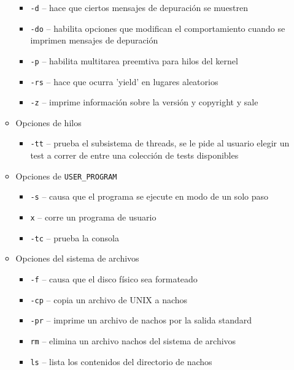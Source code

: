 \documentclass[11pt]{article}
\begin{document}
\begin{enumerate}
\begin{itemize}
                \begin{itemize}
                    \item \texttt{-d} -- hace que ciertos mensajes de depuración se muestren
                    \item \texttt{-do} -- habilita opciones que modifican el comportamiento cuando se imprimen mensajes de depuración
                    \item \texttt{-p} -- habilita multitarea preemtiva para hilos del kernel
                    \item \texttt{-rs} -- hace que ocurra 'yield' en lugares aleatorios
                    \item \texttt{-z} -- imprime información sobre la versión y copyright y sale
                \end{itemize}
            \item Opciones de hilos
                \begin{itemize}
                    \item \texttt{-tt} -- prueba el subsistema de threads, se le pide al usuario 
                          elegir un test a correr de entre una colección de tests disponibles
                \end{itemize}
            \item Opciones de \texttt{USER\_PROGRAM}
                \begin{itemize}
                    \item \texttt{-s} -- causa que el programa se ejecute en modo de un solo paso
                    \item \texttt{x} -- corre un programa de usuario
                    \item \texttt{-tc} -- prueba la consola
                \end{itemize}
            \item Opciones del sistema de archivos
                \begin{itemize}
                    \item \texttt{-f} -- causa que el disco físico sea formateado
                    \item \texttt{-cp} -- copia un archivo de UNIX a nachos
                    \item \texttt{-pr} -- imprime un archivo de nachos por la salida standard
                    \item \texttt{rm} -- elimina un archivo nachos del sistema de archivos
                    \item \texttt{ls} -- lista los contenidos del directorio de nachos

\end{itemize}
\end{itemize}
\end{enumerate}
\end{document}
